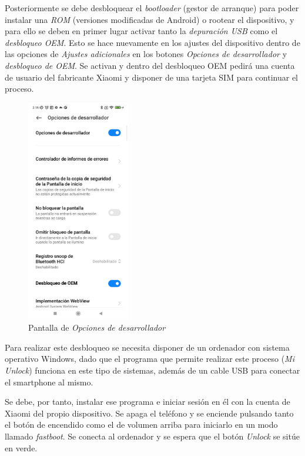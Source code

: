 \documentclass[12pt,a4paper,onecolumn,oneside]{report}
\begin{document}
Posteriormente se debe desbloquear el \textit{bootloader} (gestor de arranque) para poder instalar una \textit{ROM} (versiones modificadas de Android) o rootear el dispositivo, y para ello se deben en primer lugar activar tanto la \textit{depuración USB} como el \textit{desbloqueo OEM}. Esto se hace nuevamente en los ajustes del dispositivo dentro de las opciones de \textit{Ajustes adicionales} en los botones \textit{Opciones de desarrollador} y \textit{desbloqueo de OEM}. Se activan y dentro del desbloqueo OEM pedirá una cuenta de usuario del fabricante Xiaomi y disponer de una tarjeta SIM para continuar el proceso.

\begin{figure}[H] 
\centering
  \includegraphics[width=0.4\textwidth]{figuras/root2.png}
  \caption[Pantalla de \textit{Opciones de desarrollador}]{Pantalla de \textit{Opciones de desarrollador}\\
  }
  \label{fig:root2}
\end{figure}

Para realizar este desbloqueo se necesita disponer de un ordenador con sistema operativo Windows, dado que el programa que permite realizar este proceso (\textit{Mi Unlock}) funciona en este tipo de sistemas, además de un cable USB para conectar el smartphone al mismo.

Se debe, por tanto, instalar ese programa e iniciar sesión en él con la cuenta de Xiaomi del propio dispositivo. Se apaga el teléfono y se enciende pulsando tanto el botón de encendido como el de volumen arriba para iniciarlo en un modo llamado \textit{fastboot}. Se conecta al ordenador y se espera que el botón \textit{Unlock} se sitúe en verde.
\end{document}
